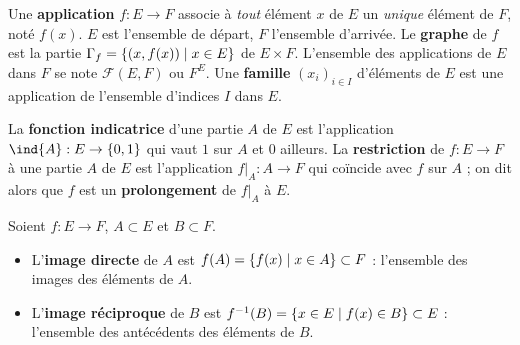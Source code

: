 
\begin{definition}
Une \textbf{application} $f:E\to F$ associe à \emph{tout} élément $x$ de $E$
un \emph{unique} élément de $F$, noté $f(x)$. $E$ est l'ensemble de départ,
$F$ l'ensemble d'arrivée. Le \textbf{graphe} de $f$ est la partie
$\Gamma_f=\left\{(x,f(x)) \mid x\in E\right\}$ de $E\times F$.
L'ensemble des applications de $E$ dans $F$ se note $\mathscr{F}(E,F)$ ou
$F^{E}$. Une \textbf{famille} $(x_i)_{i\in I}$ d'éléments de $E$ est une
application de l'ensemble d'indices $I$ dans $E$.
\end{definition}

\begin{definition}
La \textbf{fonction indicatrice} d'une partie $A$ de $E$ est l'application
$\ind{A}:E\to\ens{0,1}$ qui vaut $1$ sur $A$ et $0$ ailleurs.
La \textbf{restriction} de $f:E\to F$ à une partie $A$ de $E$ est
l'application $f|_{A}:A\to F$ qui coïncide avec $f$ sur $A$ ; on dit alors
que $f$ est un \textbf{prolongement} de $f|_{A}$ à $E$.
\end{definition}

\begin{definition}
Soient $f:E\to F$, $A\subset E$ et $B\subset F$.
\begin{itemize}[label={\color{otNavy}\textbullet},leftmargin=1.4em,itemsep=0.6mm,topsep=0.8mm]
  \item L'\textbf{image directe} de $A$ est $f(A)=\left\{f(x) \mid x\in A\right\}\subset F$ :
    l'ensemble des images des éléments de $A$.
  \item L'\textbf{image réciproque} de $B$ est
    $f^{-1}(B)=\left\{x\in E \mid f(x)\in B\right\}\subset E$ :
    l'ensemble des antécédents des éléments de $B$.
\end{itemize}
\end{definition}

